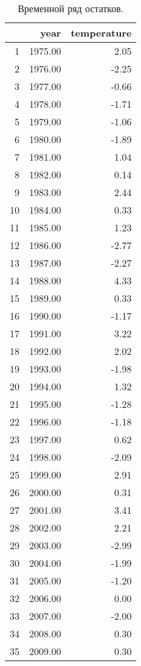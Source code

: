 \begin{table}[H]
\centering
\begin{tabular}{rrr}
  \hline
 & year & temperature \\ 
  \hline
1 & 1975.00 & 2.05 \\ 
  2 & 1976.00 & -2.25 \\ 
  3 & 1977.00 & -0.66 \\ 
  4 & 1978.00 & -1.71 \\ 
  5 & 1979.00 & -1.06 \\ 
  6 & 1980.00 & -1.89 \\ 
  7 & 1981.00 & 1.04 \\ 
  8 & 1982.00 & 0.14 \\ 
  9 & 1983.00 & 2.44 \\ 
  10 & 1984.00 & 0.33 \\ 
  11 & 1985.00 & 1.23 \\ 
  12 & 1986.00 & -2.77 \\ 
  13 & 1987.00 & -2.27 \\ 
  14 & 1988.00 & 4.33 \\ 
  15 & 1989.00 & 0.33 \\ 
  16 & 1990.00 & -1.17 \\ 
  17 & 1991.00 & 3.22 \\ 
  18 & 1992.00 & 2.02 \\ 
  19 & 1993.00 & -1.98 \\ 
  20 & 1994.00 & 1.32 \\ 
  21 & 1995.00 & -1.28 \\ 
  22 & 1996.00 & -1.18 \\ 
  23 & 1997.00 & 0.62 \\ 
  24 & 1998.00 & -2.09 \\ 
  25 & 1999.00 & 2.91 \\ 
  26 & 2000.00 & 0.31 \\ 
  27 & 2001.00 & 3.41 \\ 
  28 & 2002.00 & 2.21 \\ 
  29 & 2003.00 & -2.99 \\ 
  30 & 2004.00 & -1.99 \\ 
  31 & 2005.00 & -1.20 \\ 
  32 & 2006.00 & 0.00 \\ 
  33 & 2007.00 & -2.00 \\ 
  34 & 2008.00 & 0.30 \\ 
  35 & 2009.00 & 0.30 \\ 
   \hline
\end{tabular}
\caption{Временной ряд остатков.} 
\label{table:residuals}
\end{table}
